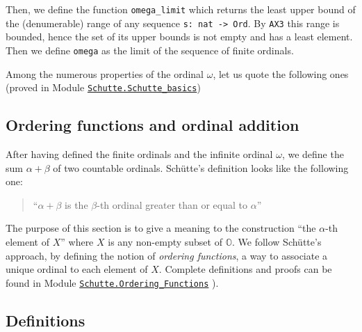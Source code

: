 




Then, we define the function \texttt{omega\_limit} which returns the least upper bound 
of the  (denumerable) range of any sequence \texttt{s: nat -> Ord}. 
By \texttt{AX3} this range is bounded, hence the set of its upper bounds is not empty and has a least element.
Then we define \texttt{omega} as the limit of the sequence of finite ordinals.



\label{sect:notation-omega}




Among the numerous properties of the ordinal $\omega$, let us quote the following ones
(proved in Module 
\href{../theories/html/hydras.Schutte.Schutte_basics.html\#finite_lt_omega}{\texttt{Schutte.Schutte\_basics}})








\subsection{Ordering functions and ordinal addition}

After having defined the finite ordinals and the infinite ordinal $\omega$, we  define the sum $\alpha+\beta$ of two countable ordinals.
Schütte's definition looks like the following one:

\begin{quote}
``$\alpha+\beta$ is the $\beta$-th ordinal greater than or equal to $\alpha$''
\end{quote}


The purpose of this section is to give a meaning to the construction
``the $\alpha$-th element of $X$''  where $X$ is any non-empty subset of $\mathbb{O}$.
We follow Schütte's approach, by defining the notion of \emph{ordering functions},
a way to associate a unique ordinal to each element of $X$.
Complete definitions and proofs can be found in Module
 \href{../theories/html/hydras.Schutte.Ordering_Functions.html}%
{\texttt{Schutte.Ordering\_Functions}} ).

\subsection{Definitions}

